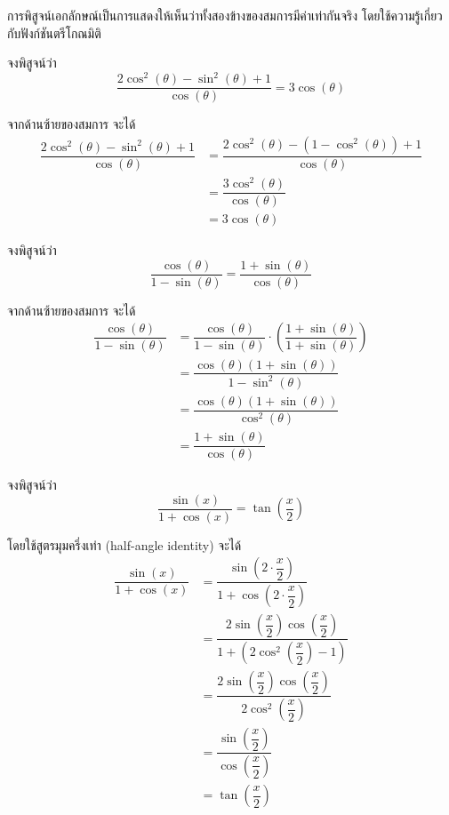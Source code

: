 การพิสูจน์เอกลักษณ์เป็นการแสดงให้เห็นว่าทั้งสองข้างของสมการมีค่าเท่ากันจริง โดยใช้ความรู้เกี่ยวกับฟังก์ชันตรีโกณมิติ

\newpage
\begin{examplebox}
	จงพิสูจน์ว่า 
	\[
	\dfrac{2 \cos^{2}(\theta) - \sin^{2}(\theta) + 1}{\cos(\theta)} = 3 \cos(\theta)
	\]
\end{examplebox}

\proof จากด้านซ้ายของสมการ จะได้
$$
\begin{aligned}
	\dfrac{2 \cos^{2}(\theta) - \sin^{2}(\theta) + 1}{\cos(\theta)}
	&= \dfrac{2 \cos^{2}(\theta) - (1 - \cos^{2}(\theta)) + 1}{\cos(\theta)} \\
	&= \dfrac{3 \cos^{2}(\theta)}{\cos(\theta)} \\
	&= 3 \cos(\theta)
\end{aligned}
$$

\begin{examplebox}
	จงพิสูจน์ว่า 
	\[
	\dfrac{\cos(\theta)}{1 - \sin(\theta)} = \dfrac{1 + \sin(\theta)}{\cos(\theta)}
	\]
\end{examplebox}

\proof จากด้านซ้ายของสมการ จะได้
$$
\begin{aligned}
	\dfrac{\cos(\theta)}{1 - \sin(\theta)}
	&= \dfrac{\cos(\theta)}{1 - \sin(\theta)} \cdot \left( \dfrac{1 + \sin(\theta)}{1 + \sin(\theta)} \right) \\
	&= \dfrac{\cos(\theta)(1 + \sin(\theta))}{1 - \sin^{2}(\theta)} \\
	&= \dfrac{\cos(\theta)(1 + \sin(\theta))}{\cos^{2}(\theta)} \\
	&= \dfrac{1 + \sin(\theta)}{\cos(\theta)}
\end{aligned}
$$

\newpage
\begin{examplebox}
	จงพิสูจน์ว่า 
	\[
	\dfrac{\sin(x)}{1 + \cos(x)} = \tan\left(\dfrac{x}{2}\right)
	\]
\end{examplebox}

\proof โดยใช้สูตรมุมครึ่งเท่า (half-angle identity) จะได้
$$
\begin{aligned}
	\dfrac{\sin(x)}{1 + \cos(x)}
	&= \dfrac{\sin\left(2\cdot \dfrac{x}{2}\right)}{1 + \cos\left(2\cdot \dfrac{x}{2}\right)} \\
	&= \dfrac{2 \sin\left(\dfrac{x}{2}\right)\cos\left(\dfrac{x}{2}\right)}{1 + \left(2\cos^{2}\left(\dfrac{x}{2}\right) - 1\right)} \\
	&= \dfrac{2 \sin\left(\dfrac{x}{2}\right)\cos\left(\dfrac{x}{2}\right)}{2\cos^{2}\left(\dfrac{x}{2}\right)} \\
	&= \dfrac{\sin\left(\dfrac{x}{2}\right)}{\cos\left(\dfrac{x}{2}\right)} \\
	&= \tan\left(\dfrac{x}{2}\right)
\end{aligned}
$$

